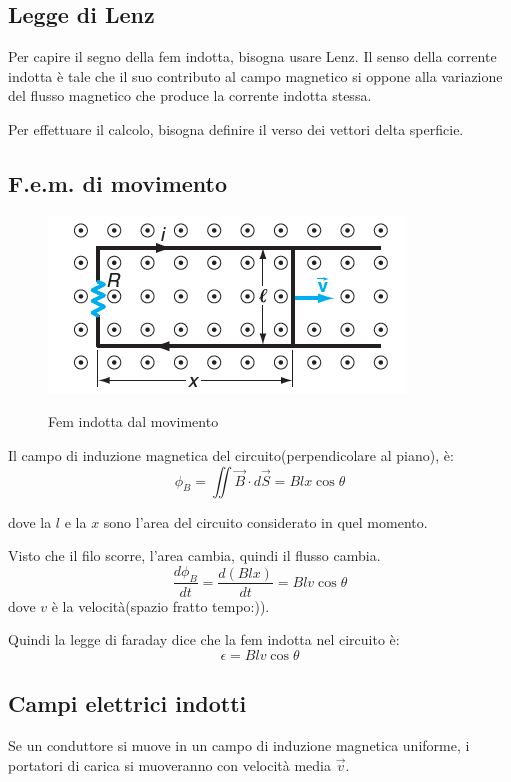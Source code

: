 \subsection{Legge di Lenz}
Per capire il segno della fem indotta, bisogna usare Lenz.
Il senso della corrente indotta è tale che il suo contributo
al campo magnetico si oppone alla variazione del flusso magnetico
che produce la corrente indotta stessa.

Per effettuare il calcolo, bisogna definire il verso dei vettori
delta sperficie.



\subsection{F.e.m. di movimento}

\begin{figure}[H]
    \centering
    \includegraphics[width=0.4\linewidth]{imgs/18 fem indotta.png}
    \label{fig:fem_movimento}
    \caption{Fem indotta dal movimento}
\end{figure}
Il campo di induzione magnetica del circuito(perpendicolare al piano),
è:
\begin{equation}
    \phi_B = \iint{\vec{B}\cdot d\vec{S}} = Blx\cos\theta
\end{equation}

dove la $l$ e la $x$ sono l'area del circuito considerato in quel momento.

Visto che il filo scorre, l'area cambia, quindi il flusso cambia.
\begin{equation}
    \frac{d\phi_B}{dt} = \frac{d(Blx)}{dt} = Blv\cos\theta
\end{equation}
dove $v$ è la velocità(spazio fratto tempo:)).

Quindi la legge di faraday dice che la fem indotta nel circuito è:
\begin{equation}
    \epsilon = Blv\cos\theta
\end{equation}

\subsection{Campi elettrici indotti}
Se un conduttore si muove in un campo di induzione magnetica
uniforme, i portatori di carica si muoveranno con velocità
media $\vec{v}$.

